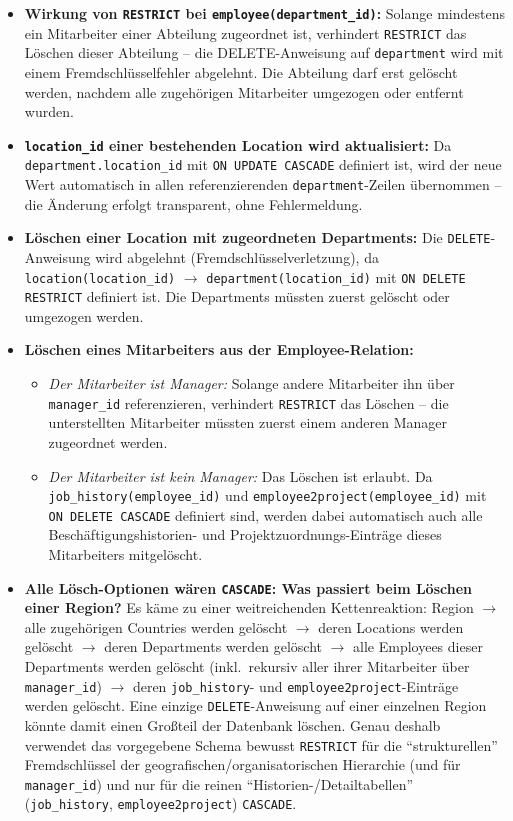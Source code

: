 \documentclass[11pt,a4paper]{article}
\begin{document}
\begin{loesung}
\begin{itemize}
\item \textbf{Wirkung von \texttt{RESTRICT} bei \texttt{employee(department\_id)}:} Solange mindestens ein Mitarbeiter einer Abteilung zugeordnet ist, verhindert \texttt{RESTRICT} das L\"oschen dieser Abteilung -- die DELETE-Anweisung auf \texttt{department} wird mit einem Fremdschl\"usselfehler abgelehnt. Die Abteilung darf erst gel\"oscht werden, nachdem alle zugeh\"origen Mitarbeiter umgezogen oder entfernt wurden.
\item \textbf{\texttt{location\_id} einer bestehenden Location wird aktualisiert:} Da \texttt{department.location\_id} mit \texttt{ON UPDATE CASCADE} definiert ist, wird der neue Wert automatisch in allen referenzierenden \texttt{department}-Zeilen \"ubernommen -- die \"Anderung erfolgt transparent, ohne Fehlermeldung.
\item \textbf{L\"oschen einer Location mit zugeordneten Departments:} Die \texttt{DELETE}-Anweisung wird abgelehnt (Fremdschl\"usselverletzung), da \texttt{location(location\_id)} $\to$ \texttt{department(location\_id)} mit \texttt{ON DELETE RESTRICT} definiert ist. Die Departments m\"ussten zuerst gel\"oscht oder umgezogen werden.
\item \textbf{L\"oschen eines Mitarbeiters aus der Employee-Relation:}
  \begin{itemize}
  \item \emph{Der Mitarbeiter ist Manager:} Solange andere Mitarbeiter ihn \"uber \texttt{manager\_id} referenzieren, verhindert \texttt{RESTRICT} das L\"oschen -- die unterstellten Mitarbeiter m\"ussten zuerst einem anderen Manager zugeordnet werden.
  \item \emph{Der Mitarbeiter ist kein Manager:} Das L\"oschen ist erlaubt. Da \texttt{job\_history(employee\_id)} und \texttt{employee2project(employee\_id)} mit \texttt{ON DELETE CASCADE} definiert sind, werden dabei automatisch auch alle Besch\"aftigungshistorien- und Projektzuordnungs-Eintr\"age dieses Mitarbeiters mitgel\"oscht.
  \end{itemize}
\item \textbf{Alle L\"osch-Optionen w\"aren \texttt{CASCADE}: Was passiert beim L\"oschen einer Region?} Es k\"ame zu einer weitreichenden Kettenreaktion: Region $\to$ alle zugeh\"origen Countries werden gel\"oscht $\to$ deren Locations werden gel\"oscht $\to$ deren Departments werden gel\"oscht $\to$ alle Employees dieser Departments werden gel\"oscht (inkl.\ rekursiv aller ihrer Mitarbeiter \"uber \texttt{manager\_id}) $\to$ deren \texttt{job\_history}- und \texttt{employee2project}-Eintr\"age werden gel\"oscht. Eine einzige \texttt{DELETE}-Anweisung auf einer einzelnen Region k\"onnte damit einen Gro\ss{}teil der Datenbank l\"oschen. Genau deshalb verwendet das vorgegebene Schema bewusst \texttt{RESTRICT} f\"ur die ``strukturellen'' Fremdschl\"ussel der geografischen/organisatorischen Hierarchie (und f\"ur \texttt{manager\_id}) und nur f\"ur die reinen ``Historien-/Detailtabellen'' (\texttt{job\_history}, \texttt{employee2project}) \texttt{CASCADE}.
\end{itemize}
\end{loesung}
\end{document}
